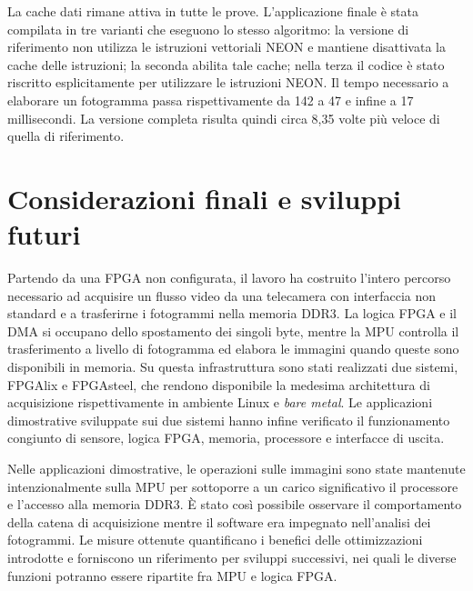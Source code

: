 La cache dati rimane attiva in tutte le prove. L'applicazione finale è stata compilata in tre varianti che eseguono lo stesso algoritmo: la versione di riferimento non utilizza le istruzioni vettoriali NEON e mantiene disattivata la cache delle istruzioni; la seconda abilita tale cache; nella terza il codice è stato riscritto esplicitamente per utilizzare le istruzioni NEON. Il tempo necessario a elaborare un fotogramma passa rispettivamente da 142 a 47 e infine a 17 millisecondi. La versione completa risulta quindi circa 8,35 volte più veloce di quella di riferimento.

\section{Considerazioni finali e sviluppi futuri}

Partendo da una FPGA non configurata, il lavoro ha costruito l'intero percorso necessario ad acquisire un flusso video da una telecamera con interfaccia non standard e a trasferirne i fotogrammi nella memoria DDR3. La logica FPGA e il DMA si occupano dello spostamento dei singoli byte, mentre la MPU controlla il trasferimento a livello di fotogramma ed elabora le immagini quando queste sono disponibili in memoria. Su questa infrastruttura sono stati realizzati due sistemi, FPGAlix e FPGAsteel, che rendono disponibile la medesima architettura di acquisizione rispettivamente in ambiente Linux e \emph{bare metal}. Le applicazioni dimostrative sviluppate sui due sistemi hanno infine verificato il funzionamento congiunto di sensore, logica FPGA, memoria, processore e interfacce di uscita.

Nelle applicazioni dimostrative, le operazioni sulle immagini sono state mantenute intenzionalmente sulla MPU per sottoporre a un carico significativo il processore e l'accesso alla memoria DDR3. È stato così possibile osservare il comportamento della catena di acquisizione mentre il software era impegnato nell'analisi dei fotogrammi. Le misure ottenute quantificano i benefici delle ottimizzazioni introdotte e forniscono un riferimento per sviluppi successivi, nei quali le diverse funzioni potranno essere ripartite fra MPU e logica FPGA.

